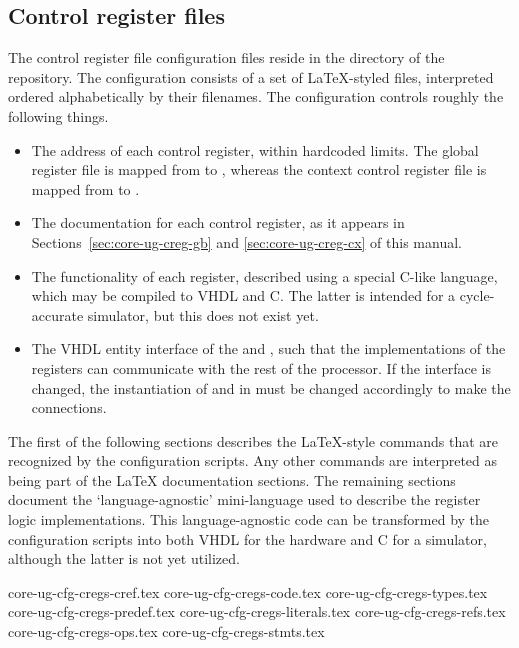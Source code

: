 
\subsection{Control register files}
\label{sec:core-ug-cfg-cregs}

The control register file configuration files reside in the 
directory of the \rvex{} repository. The configuration consists of a set of
LaTeX-styled files, interpreted ordered alphabetically by their filenames. The
configuration controls roughly the following things.

\begin{itemize}

\item The address of each control register, within hardcoded limits. The global
      register file is mapped from  to , whereas the
      context control register file is mapped from  to .

\item The documentation for each control register, as it appears in
      Sections~\ref{sec:core-ug-creg-gb} and \ref{sec:core-ug-creg-cx} of this
      manual.
      
\item The functionality of each register, described using a special C-like
      language, which may be compiled to VHDL and C. The latter is intended for
      a cycle-accurate simulator, but this does not exist yet.
      
\item The VHDL entity interface of the  and ,
      such that the implementations of the registers can communicate with the
      rest of the processor. If the interface is changed, the instantiation of
       and  in  must be changed
      accordingly to make the connections.

\end{itemize}

\noindent The first of the following sections describes the LaTeX-style commands 
that are recognized by the configuration scripts. Any other commands are 
interpreted as being part of the LaTeX documentation sections. The remaining 
sections document the `language-agnostic' mini-language used to describe the 
register logic implementations. This language-agnostic code can be transformed 
by the configuration scripts into both VHDL for the hardware and C for a 
simulator, although the latter is not yet utilized.

{core-ug-cfg-cregs-cref.tex}
{core-ug-cfg-cregs-code.tex}
{core-ug-cfg-cregs-types.tex}
{core-ug-cfg-cregs-predef.tex}
{core-ug-cfg-cregs-literals.tex}
{core-ug-cfg-cregs-refs.tex}
{core-ug-cfg-cregs-ops.tex}
{core-ug-cfg-cregs-stmts.tex}
